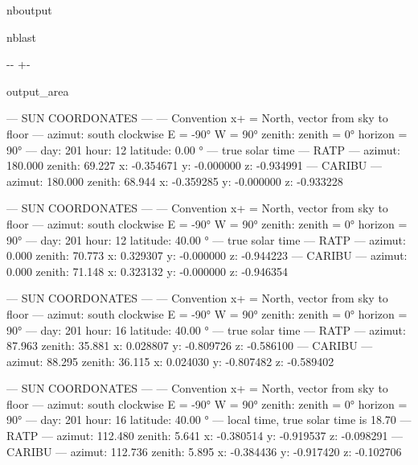 \documentclass[letterpaper,10pt,english]{sphinxmanual}
\begin{document}
\begin{sphinxuseclass}{nboutput}
\begin{sphinxuseclass}{nblast}
{

\kern-\sphinxverbatimsmallskipamount\kern-\baselineskip
\kern+\FrameHeightAdjust\kern-\fboxrule
\vspace{\nbsphinxcodecellspacing}

\begin{sphinxuseclass}{output_area}
\begin{sphinxuseclass}{}


\begin{sphinxVerbatim}[commandchars=\\\{\}]
---      SUN COORDONATES         ---
--- Convention x+ = North, vector from sky to floor
--- azimut: south clockwise E = -90° W = 90°     zenith:                                 zenith = 0° horizon = 90°
--- day: 201     hour: 12        latitude: 0.00 °
--- true solar time
--- RATP ---
         azimut: 180.000         zenith: 69.227
         x: -0.354671    y: -0.000000    z: -0.934991
--- CARIBU ---
         azimut: 180.000         zenith: 68.944
         x: -0.359285    y: -0.000000    z: -0.933228


---      SUN COORDONATES         ---
--- Convention x+ = North, vector from sky to floor
--- azimut: south clockwise E = -90° W = 90°     zenith:                                 zenith = 0° horizon = 90°
--- day: 201     hour: 12        latitude: 40.00 °
--- true solar time
--- RATP ---
         azimut: 0.000   zenith: 70.773
         x: 0.329307     y: -0.000000    z: -0.944223
--- CARIBU ---
         azimut: 0.000   zenith: 71.148
         x: 0.323132     y: -0.000000    z: -0.946354


---      SUN COORDONATES         ---
--- Convention x+ = North, vector from sky to floor
--- azimut: south clockwise E = -90° W = 90°     zenith:                                 zenith = 0° horizon = 90°
--- day: 201     hour: 16        latitude: 40.00 °
--- true solar time
--- RATP ---
         azimut: 87.963          zenith: 35.881
         x: 0.028807     y: -0.809726    z: -0.586100
--- CARIBU ---
         azimut: 88.295          zenith: 36.115
         x: 0.024030     y: -0.807482    z: -0.589402


---      SUN COORDONATES         ---
--- Convention x+ = North, vector from sky to floor
--- azimut: south clockwise E = -90° W = 90°     zenith:                                 zenith = 0° horizon = 90°
--- day: 201     hour: 16        latitude: 40.00 °
--- local time, true solar time is 18.70
--- RATP ---
         azimut: 112.480         zenith: 5.641
         x: -0.380514    y: -0.919537    z: -0.098291
--- CARIBU ---
         azimut: 112.736         zenith: 5.895
         x: -0.384436    y: -0.917420    z: -0.102706



\end{sphinxVerbatim}
\end{sphinxuseclass}
\end{sphinxuseclass}}
\end{sphinxuseclass}
\end{sphinxuseclass}
\end{document}
